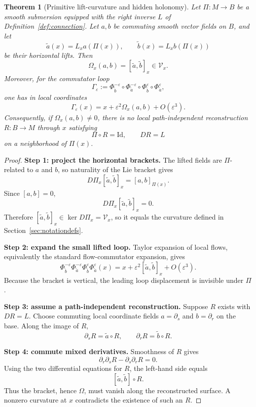 \documentclass[12pt]{article}
\newtheorem{theorem}{Theorem}[section]
\newcommand{\eps}{\varepsilon}
\newcommand{\Id}{\mathrm{Id}}
\newcommand{\Vv}{\mathcal V}
\begin{document}
\begin{theorem}[Primitive lift-curvature and hidden holonomy]\label{thm:curvature}
Let $\Pi:M\to B$ be a smooth submersion equipped with the right inverse $L$ of Definition~\ref{def:connection}. Let $a,b$ be commuting smooth vector fields on $B$, and let
\[
\widetilde a(x)=L_xa(\Pi(x)),
\qquad
\widetilde b(x)=L_xb(\Pi(x))
\]
be their horizontal lifts. Then
\[
\Omega_x(a,b)=[\widetilde a,\widetilde b]_x\in\Vv_x.
\]
Moreover, for the commutator loop
\[
\Gamma_\eps
:=\Phi^{-\eps}_{\widetilde b}
\circ\Phi^{-\eps}_{\widetilde a}
\circ\Phi^{\eps}_{\widetilde b}
\circ\Phi^{\eps}_{\widetilde a},
\]
one has in local coordinates
\[
\Gamma_\eps(x)
=x+\eps^2\Omega_x(a,b)+O(\eps^3).
\]
Consequently, if $\Omega_x(a,b)\neq0$, there is no local path-independent reconstruction $R:B\to M$ through $x$ satisfying
\[
\Pi\circ R=\Id,
\qquad
DR=L
\]
on a neighborhood of $\Pi(x)$.
\end{theorem}

\begin{proof}
\textbf{Step 1: project the horizontal brackets.}
The lifted fields are $\Pi$-related to $a$ and $b$, so naturality of the Lie bracket gives
\[
D\Pi_x[\widetilde a,\widetilde b]_x
=[a,b]_{\Pi(x)}.
\]
Since $[a,b]=0$,
\[
D\Pi_x[\widetilde a,\widetilde b]_x=0.
\]
Therefore $[\widetilde a,\widetilde b]_x\in\ker D\Pi_x=\Vv_x$, so it equals the curvature defined in Section~\ref{sec:notationdefs}.

\textbf{Step 2: expand the small lifted loop.}
Taylor expansion of local flows, equivalently the standard flow-commutator expansion, gives
\[
\Phi^{-\eps}_{\widetilde b}
\Phi^{-\eps}_{\widetilde a}
\Phi^{\eps}_{\widetilde b}
\Phi^{\eps}_{\widetilde a}(x)
=x+\eps^2[\widetilde a,\widetilde b]_x+O(\eps^3).
\]
Because the bracket is vertical, the leading loop displacement is invisible under $\Pi$.

\textbf{Step 3: assume a path-independent reconstruction.}
Suppose $R$ exists with $DR=L$. Choose commuting local coordinate fields $a=\partial_s$ and $b=\partial_r$ on the base. Along the image of $R$,
\[
\partial_sR=\widetilde a\circ R,
\qquad
\partial_rR=\widetilde b\circ R.
\]

\textbf{Step 4: commute mixed derivatives.}
Smoothness of $R$ gives
\[
\partial_r\partial_sR-\partial_s\partial_rR=0.
\]
Using the two differential equations for $R$, the left-hand side equals
\[
[\widetilde a,\widetilde b]\circ R.
\]
Thus the bracket, hence $\Omega$, must vanish along the reconstructed surface. A nonzero curvature at $x$ contradicts the existence of such an $R$.
\end{proof}
\end{document}
